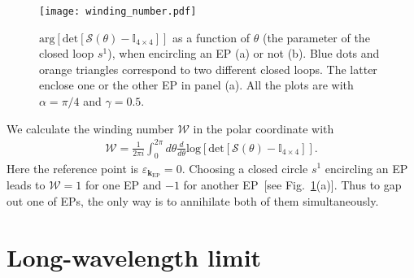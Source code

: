 \documentclass[aps,pra,reprint,superscriptaddress,showkeys,amsmath,amssymb,longbibliography]{revtex4-1}
\begin{document}
\begin{figure}
\centering
\texttt{[image: winding\_number.pdf]}
\caption{$\text{arg}[\text{det}[\mathcal{S}(\theta)-\mathbb{I}_{4\times 4}]]$ as a function of $\theta$ (the parameter of the closed loop $s^1$), when encircling an EP (a) or not (b). 
Blue dots and orange triangles correspond to two different closed loops. 
The latter enclose one or the other EP in panel (a).
All the plots are with $\alpha=\pi/4$ and $\gamma=0.5$.
\label{fig: winding}}
\end{figure}

We calculate the winding number $\mathcal{W}$ in the polar coordinate with
\begin{eqnarray}
\mathcal{W}=\frac{1}{2\pi i}\int_{0}^{2\pi}d\theta\frac{d}{d\theta}\text{log}[\text{det}[\mathcal{S}(\theta)-\mathbb{I}_{4\times 4}]].
\end{eqnarray}
Here the reference point is $\varepsilon_{\textbf{k}_{\text{EP}}}=0$.
Choosing a closed circle $s^1$ encircling an EP leads to $\mathcal{W}=1$ for one EP and $-1$ for another EP~[see Fig.~\ref{fig: winding}(a)].
Thus to gap out one of EPs, the only way is to annihilate both of them simultaneously.

\section{Long-wavelength limit}
\label{app:longwavelength_limit}
\end{document}
